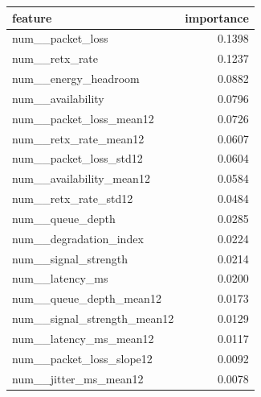 \begin{tabular}{lr}
\toprule
feature & importance \\
\midrule
num\_\_packet\_loss & 0.1398 \\
num\_\_retx\_rate & 0.1237 \\
num\_\_energy\_headroom & 0.0882 \\
num\_\_availability & 0.0796 \\
num\_\_packet\_loss\_mean12 & 0.0726 \\
num\_\_retx\_rate\_mean12 & 0.0607 \\
num\_\_packet\_loss\_std12 & 0.0604 \\
num\_\_availability\_mean12 & 0.0584 \\
num\_\_retx\_rate\_std12 & 0.0484 \\
num\_\_queue\_depth & 0.0285 \\
num\_\_degradation\_index & 0.0224 \\
num\_\_signal\_strength & 0.0214 \\
num\_\_latency\_ms & 0.0200 \\
num\_\_queue\_depth\_mean12 & 0.0173 \\
num\_\_signal\_strength\_mean12 & 0.0129 \\
num\_\_latency\_ms\_mean12 & 0.0117 \\
num\_\_packet\_loss\_slope12 & 0.0092 \\
num\_\_jitter\_ms\_mean12 & 0.0078 \\
\bottomrule
\end{tabular}
